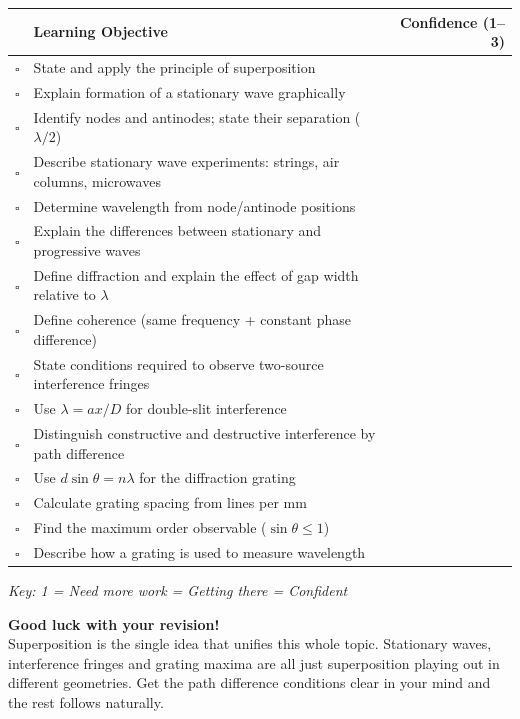 \begin{tcolorbox}[colback=white, colframe=darkblue, breakable]
\renewcommand{\arraystretch}{1.5}
\begin{tabular}{@{} c p{10.5cm} r @{}}
\toprule
 & \textbf{Learning Objective} & \textbf{Confidence (1--3)} \\
\midrule
$\square$ & State and apply the principle of superposition & \\
$\square$ & Explain formation of a stationary wave graphically & \\
$\square$ & Identify nodes and antinodes; state their separation ($\lambda/2$) & \\
$\square$ & Describe stationary wave experiments: strings, air columns, microwaves & \\
$\square$ & Determine wavelength from node/antinode positions & \\
$\square$ & Explain the differences between stationary and progressive waves & \\
$\square$ & Define diffraction and explain the effect of gap width relative to $\lambda$ & \\
$\square$ & Define coherence (same frequency + constant phase difference) & \\
$\square$ & State conditions required to observe two-source interference fringes & \\
$\square$ & Use $\lambda = ax/D$ for double-slit interference & \\
$\square$ & Distinguish constructive and destructive interference by path difference & \\
$\square$ & Use $d\sin\theta = n\lambda$ for the diffraction grating & \\
$\square$ & Calculate grating spacing from lines per mm & \\
$\square$ & Find the maximum order observable ($\sin\theta \leq 1$) & \\
$\square$ & Describe how a grating is used to measure wavelength & \\
\bottomrule
\end{tabular}
\vspace{0.5em}
\textit{Key: 1 = Need more work  = Getting there  = Confident}
\end{tcolorbox}

\vspace{1em}
\begin{motivationbox}
\centering
\textbf{\color{darkblue}Good luck with your revision!}\\[0.2em]
{\color{darkgray}\small Superposition is the single idea that unifies this whole topic. Stationary waves, interference fringes and grating maxima are all just superposition playing out in different geometries. Get the path difference conditions clear in your mind and the rest follows naturally.}
\end{motivationbox}
